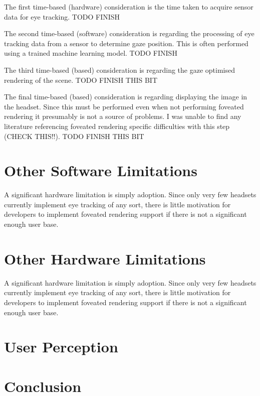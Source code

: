 \documentclass[a4paper,11pt]{article}
\begin{document}
The first time-based (hardware) consideration is the time taken to acquire sensor data for eye tracking. TODO FINISH

The second time-based (software) consideration is regarding the processing of eye tracking data from a sensor to determine gaze position. This is often performed using a trained machine learning model. TODO FINISH

The third time-based (based) consideration is regarding the gaze optimised rendering of the scene. TODO FINISH THIS BIT

The final time-based (based) consideration is regarding displaying the image in the headset. Since this must be performed even when not performing foveated rendering it presumably is not a source of problems. I was unable to find any literature referencing foveated rendering specific difficulties with this step (CHECK THIS!!). TODO FINISH THIS BIT

\begin{figure}
  \begin{center}
    
    \caption{}
    \label{fig:eye}
  \end{center}
\end{figure}

\section{Other Software Limitations}
A significant hardware limitation is simply adoption. Since only very few headsets currently implement eye tracking of any sort, there is little motivation for developers to implement foveated rendering support if there is not a significant enough user base.

\section{Other Hardware Limitations}
A significant hardware limitation is simply adoption. Since only very few headsets currently implement eye tracking of any sort, there is little motivation for developers to implement foveated rendering support if there is not a significant enough user base.

\section{User Perception}

\section{Conclusion}

\printbibliography
\end{document}
